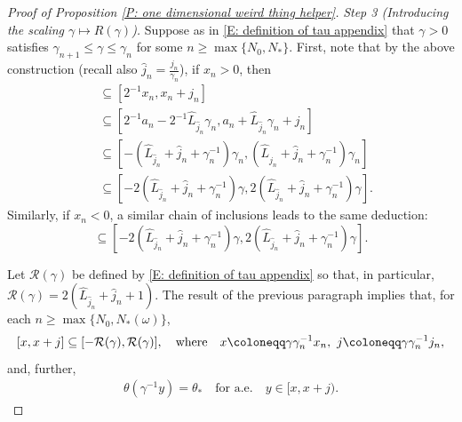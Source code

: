 \documentclass[12pt]{amsart}
\begin{document}
\begin{proof}[Proof of Proposition \ref{P: one dimensional weird thing helper}]
\textit{Step 3 (Introducing the scaling $\gamma \mapsto R(\gamma)$).} Suppose as in \eqref{E: definition of tau appendix} that $\gamma > 0$ satisfies $\gamma_{n+1} \leq \gamma \leq \gamma_{n}$ for some $n \geq \max\{N_{0},N_{*}\}$. First, note that by the above construction (recall also $ \widehat{j}_n = \frac{j_n}{ \gamma _n } $), if $x_{n} > 0$, then
%
\begin{align*}
[ \gamma \gamma_n^{-1} x_n , \gamma \gamma_n^{-1}  x_n + \gamma \gamma_{n}^{-1} j_n ] 
& \subseteq [ 2^{-1} x_n , x_n + j_n ] \\
& \subseteq [ 2^{-1} a_n - 2^{-1} \widehat{L}_{ \widehat{j}_n } \gamma_n , a_n + \widehat{L}_{ \widehat{j}_n } \gamma_n + j_n ]  \\
& \subseteq [ - ( \widehat{L}_{ \widehat{j}_n } + \widehat{j}_n + \gamma_n^{-1} ) \gamma_n , ( \widehat{L}_{ \widehat{j}_n } + \widehat{j}_n + \gamma_n^{-1} ) \gamma_n ] \\
& \subseteq [ - 2 ( \widehat{L}_{ \widehat{j}_n } + \widehat{j}_n + \gamma_n^{-1} ) \gamma , 2 ( \widehat{L}_{ \widehat{j}_n } + \widehat{j}_n + \gamma_n^{-1} ) \gamma ] .
\end{align*}
%
Similarly, if $x_{n} < 0$, a similar chain of inclusions leads to the same deduction:
	\begin{equation*}
		[ \gamma \gamma_n^{-1} x_n , \gamma \gamma_n^{-1}  x_n + \gamma \gamma_{n}^{-1} j_n ] \subseteq  [ - 2 ( \widehat{L}_{ \widehat{j}_n } + \widehat{j}_n + \gamma_n^{-1} ) \gamma , 2 ( \widehat{L}_{ \widehat{j}_n } + \widehat{j}_n + \gamma_n^{-1} ) \gamma ].
	\end{equation*}

Let $\mathcal{R}(\gamma)$ be defined by \eqref{E: definition of tau appendix} so that, in particular, $ \mathcal{R}(\gamma) = 2 ( \widehat{L}_{ \widehat{j}_n } + \widehat{j}_n + 1 ) $. The result of the previous paragraph implies that, for each $n \geq \max\{N_{0}, N_{*}(\omega)\}$,
	\begin{equation} \label{E: minimum inclusion}
		[  x , x + j ] 
		\subseteq [ - \mathcal{R}(\gamma) , \mathcal{R}(\gamma) ], 
		\quad { \rm where } \quad 
		x \coloneqq \gamma \gamma_n^{-1} x_n, \, \, j \coloneqq \gamma \gamma_{n}^{-1} j_n ,
	\end{equation}
and, further,
	\begin{align} \label{E: long intervals}
	\theta(\gamma^{-1} y) = \theta_{*} \quad \text{for a.e.} \quad y \in [ x, x + j) .
\end{align}


\end{proof}
\end{document}
